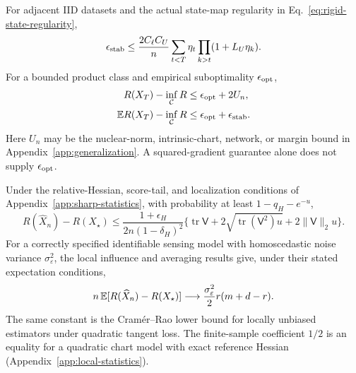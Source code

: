 \begin{theorem}
For adjacent IID datasets and the actual state-map regularity in
Eq.~\eqref{eq:rigid-state-regularity},
\begin{equation}
\epsilon_{\rm stab}\leq
\frac{2C_\ell C_U}{n}\sum_{t<T}\eta_t
\prod_{k>t}(1+L_U\eta_k).
\label{eq:main-generalization}
\end{equation}
For a bounded product class and empirical suboptimality
$\epsilon_{\rm opt}$,
\begin{align}
R(X_T)-\inf_{\mathcal C}R
&\leq\epsilon_{\rm opt}+2U_n,\\
\mathbb E R(X_T)-\inf_{\mathcal C}R
&\leq\epsilon_{\rm opt}+\epsilon_{\rm stab}.
\end{align}
Here $U_n$ may be the nuclear-norm, intrinsic-chart, network, or margin
bound in Appendix~\ref{app:generalization}. A squared-gradient guarantee
alone does not supply $\epsilon_{\rm opt}$.
\end{theorem}

\begin{theorem}
Under the relative-Hessian, score-tail, and localization conditions of
Appendix~\ref{app:sharp-statistics}, with probability at least
$1-q_H-e^{-u}$,
\begin{equation}
R(\widehat X_n)-R(X_\star)
\leq\frac{1+\epsilon_H}{2n(1-\delta_H)^2}
\{\operatorname{tr}\mathsf V+
2\sqrt{\operatorname{tr}(\mathsf V^2)u}+2\|\mathsf V\|_2u\}.
\end{equation}
For a correctly specified identifiable sensing model with homoscedastic noise variance
$\sigma_\varepsilon^2$, the local influence and averaging results give,
under their stated expectation conditions,
\begin{equation}
n\,\mathbb E[R(\widehat X_n)-R(X_\star)]
\longrightarrow\frac{\sigma_\varepsilon^2}{2}r(m+d-r).
\end{equation}
The same constant is the Cram\'er--Rao lower bound for locally unbiased
estimators under quadratic tangent loss. The finite-sample coefficient
$1/2$ is an equality for a quadratic chart model with exact reference
Hessian (Appendix~\ref{app:local-statistics}).
\end{theorem}
